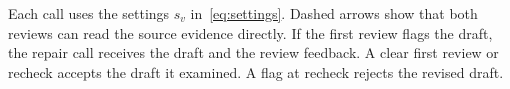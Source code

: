 \caption{Each call uses the settings $s_v$ in~\eqref{eq:settings}.
Dashed arrows show that both reviews can read the source evidence directly.
If the first review flags the draft, the repair call receives the draft and the review feedback.
A clear first review or recheck accepts the draft it examined. A flag at recheck rejects the revised draft.}

